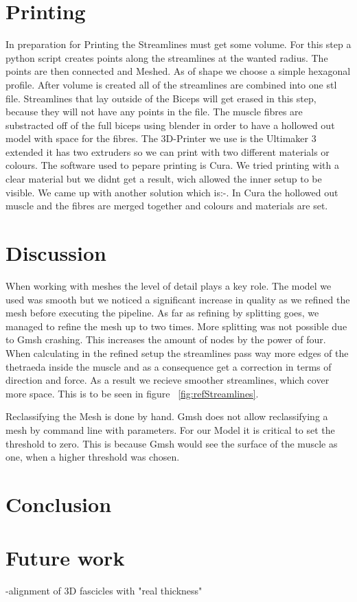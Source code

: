 \documentclass[preprint,journal]{vgtc}       %
\begin{document}
\section{Printing}
In preparation for Printing the Streamlines must get some volume. For this step a python script creates points along the streamlines at the wanted radius. The points are then connected and Meshed. As of shape we choose a simple hexagonal profile. After volume is created all of the streamlines are combined into one stl file. Streamlines that lay outside of the Biceps will get erased in this step, because they will not have any points in the file. The muscle fibres are substracted off of the full biceps using blender in order to have a hollowed out model with space for the fibres. 
The 3D-Printer we use is the Ultimaker 3 extended it has two extruders so we can print with two different materials or colours. The software used to pepare printing is Cura. We tried printing with a clear material but we didnt get a result, wich allowed the inner setup to be visible. We came up with another solution which is:-.
In Cura the hollowed out muscle and the fibres are merged together and colours and materials are set.

\section{Discussion}
When working with meshes the level of detail plays a key role. The model we used was smooth but we noticed a significant increase in quality as we refined the mesh before executing the pipeline. As far as refining by splitting goes, we managed to refine the mesh up to two times. More splitting was not possible due to Gmsh crashing. This increases the amount of nodes by the power of four. When calculating in the refined setup the streamlines pass way more edges of the thetraeda inside the muscle and as a consequence get a correction in terms of direction and force. As a result we recieve smoother streamlines, which cover more space. This is to be seen in figure ~\ref{fig:refStreamlines}.

Reclassifying the Mesh is done by hand. Gmsh does not allow reclassifying a mesh by command line with parameters. For our Model it is critical to set the threshold to zero. This is because Gmsh would see the surface of the muscle as one, when a higher threshold was chosen.

\section{Conclusion}


\section{Future work}
-alignment of 3D fascicles with "real thickness"



\end{document}
